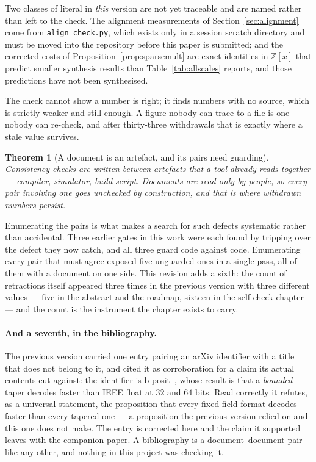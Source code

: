 \documentclass[11pt]{article}
\newtheorem{theorem}{Theorem}
\theoremstyle{definition}
\begin{document}
Two classes of literal in \emph{this} version are not yet traceable and are named
rather than left to the check. The alignment measurements of
Section~\ref{sec:alignment} come from \texttt{align\_check.py}, which exists only
in a session scratch directory and must be moved into the repository before this
paper is submitted; and the corrected costs of
Proposition~\ref{prop:sparsemult} are exact identities in $\mathbb{Z}[x]$ that
predict smaller synthesis results than Table~\ref{tab:allscales} reports, and
those predictions have not been synthesised.

The check cannot show a number is right; it finds numbers with no source, which
is strictly weaker and still enough. A figure nobody can trace to a file is one
nobody can re-check, and after thirty-three withdrawals that is exactly where a
stale value survives.

\begin{theorem}[A document is an artefact, and its pairs need guarding]
\label{thm:doctrace}
Consistency checks are written between artefacts that a tool already reads
together --- compiler, simulator, build script. Documents are read only by
people, so every pair involving one goes unchecked by construction, and that is
where withdrawn numbers persist.
\end{theorem}

Enumerating the pairs is what makes a search for such defects systematic rather
than accidental. Three earlier gates in this work were each found by tripping
over the defect they now catch, and all three guard code against code.
Enumerating every pair that must agree exposed five unguarded ones in a single
pass, all of them with a document on one side. This revision adds a sixth: the
count of retractions itself appeared three times in the previous version with
three different values --- five in the abstract and the roadmap, sixteen in the
self-check chapter --- and the count is the instrument the chapter exists to
carry.

\paragraph{And a seventh, in the bibliography.} The previous version carried one
entry pairing an arXiv identifier with a title that does not belong to it, and
cited it as corroboration for a claim its actual contents cut against: the
identifier is b-posit~\cite{bposit}, whose result is that a \emph{bounded} taper
decodes faster than IEEE float at $32$ and $64$ bits. Read correctly it refutes,
as a universal statement, the proposition that every fixed-field format decodes
faster than every tapered one --- a proposition the previous version relied on
and this one does not make. The entry is corrected here and the claim it
supported leaves with the companion paper. A bibliography is a document--document
pair like any other, and nothing in this project was checking it.
\end{document}
